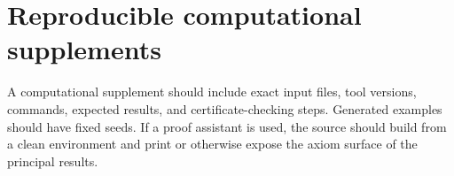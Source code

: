 \section{Reproducible computational supplements}
\label{sec:research-workflow-03}

A computational supplement should include exact input files, tool versions,
commands, expected results, and certificate-checking steps.  Generated examples
should have fixed seeds.  If a proof assistant is used, the source should build
from a clean environment and print or otherwise expose the axiom surface of the
principal results.

